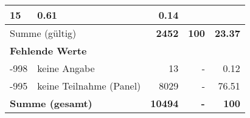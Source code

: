 \begin{longtable}{lXrrr}
       \num{15} &
       \num[round-mode=places,round-precision=2]{0.61} &
         \num[round-mode=places,round-precision=2]{0.14} \\
     \midrule
     \multicolumn{2}{l}{Summe (gültig)} &
       \textbf{\num{2452}} &
     \textbf{\num{100}} &
       \textbf{\num[round-mode=places,round-precision=2]{23.37}} \\
     \multicolumn{5}{l}{\textbf{Fehlende Werte}}\\
       -998 &
       keine Angabe &
         \num{13} &
        - &
         \num[round-mode=places,round-precision=2]{0.12} \\
       -995 &
       keine Teilnahme (Panel) &
         \num{8029} &
        - &
         \num[round-mode=places,round-precision=2]{76.51} \\
     \midrule
     \multicolumn{2}{l}{\textbf{Summe (gesamt)}} &
          \textbf{\num{10494}} &
        \textbf{-} &
        \textbf{\num{100}} \\
     \bottomrule
     \end{longtable}
     
